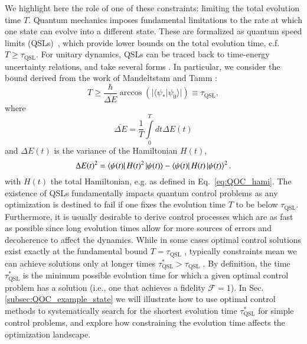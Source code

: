 We highlight here the role of one of these constraints: limiting the total evolution time $T$. Quantum mechanics imposes fundamental limitations to the rate at which one state can evolve into a different state. These are formalized as quantum speed limits (QSLs)~\cite{Deffner2017}, which provide lower bounds on the total evolution time, c.f. $T\geq \tau_{\text{QSL}}$. For unitary dynamics, QSLs can be traced back to time-energy uncertainty relations, and take several forms \cite{taddei2013, pires2016, mondal2016,marvian2016}. In particular, we consider the bound derived from the work of Mandeltstam and Tamm \cite{mandelstam_45,bhattacharyya1983}:
\begin{equation}
    T \geq \frac{\hbar}{\overline{\Delta E}}\arccos\left(\lvert \langle \psi_\ast|\psi_0\rangle\rvert\right) \equiv \tau_{\text{QSL}},
    \label{eq:Tqsl}
\end{equation}
 where 
\begin{equation}
    \overline{\Delta E} = \frac{1}{T}\int\limits_0^T dt \Delta E(t)
\end{equation}
and $\Delta E(t)$ is the variance of the Hamiltonian $H(t)$,
\begin{equation}
    \Delta E(t)^2 = \bra{\psi(t)}H(t)^2\ket{\psi(t)}-\bra{\psi(t)}H(t)\ket{\psi(t)}^2.
\end{equation}
with $H(t)$ the total Hamiltonian, e.g. as defined in Eq.~\eqref{eq:QOC_hami}. The existence of QSLs fundamentally impacts quantum control problems as any optimization is destined to fail if one fixes the evolution time $T$ to be below $\tau_{\text{QSL}}$. Furthermore, it is usually desirable to derive control processes which are as fast as possible since long evolution times allow for more sources of errors and decoherence to affect the dynamics. While in some cases optimal control solutions exist exactly at the fundamental bound $T=\tau_\text{QSL}$ \cite{caneva2009}, typically constraints mean we can achieve  solutions only at longer times $\tau_\text{QSL}^\ast>\tau_\text{QSL}$ \cite{hegerfeldt2013,poggi2019geometric}. By definition, the time $\tau_\text{QSL}^\ast$ is the minimum possible evolution time for which a given optimal control problem has a solution (i.e., one that achieves a fidelity $\mathcal{F}=1$). In Sec. \ref{subsec:QOC_example_state} we will illustrate how to use optimal control methods to systematically search for the shortest evolution time $\tau_{\text{QSL}}^\ast$ for simple control problems, and explore how constraining the evolution time affects the optimization landscape. 

